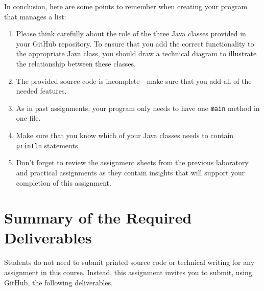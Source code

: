 \documentclass[11pt]{article}
\newcommand{\command}[1]{``\lstinline{#1}''}
\begin{document}
\noindent
In conclusion, here are some points to remember when creating your program that manages a list:

\begin{enumerate}
  \setlength{\itemsep}{0pt}

\item Please think carefully about the role of the three Java classes provided
  in your GitHub repository. To ensure that you add the correct functionality to
  the appropriate Java class, you should draw a technical diagram to illustrate
  the relationship between these classes.

\item The provided source code is incomplete---make sure that you add all of the
  needed features.

\item As in past assignments, your program only needs to have one {\tt main}
  method in one file.

\item Make sure that you know which of your Java classes needs to contain {\tt
  println} statements.

\item Don't forget to review the assignment sheets from the previous laboratory
  and practical assignments as they contain insights that will support your
  completion of this assignment.



\end{enumerate}

\section*{Summary of the Required Deliverables}

\noindent Students do not need to submit printed source code or technical
writing for any assignment in this course. Instead, this assignment invites you
to submit, using GitHub, the following deliverables.
\end{document}
